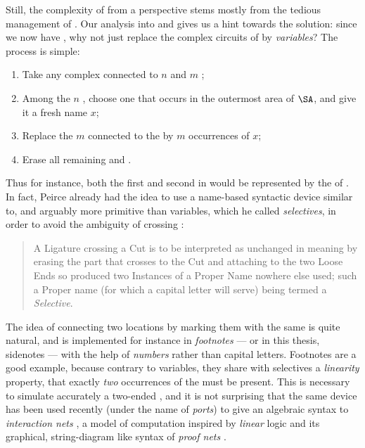 \begin{scope}
\begin{scope}
Still, the complexity of  from a  perspective stems mostly from the
tedious management of . Our analysis into  and  gives us
a hint towards the solution: since we now have , why not just replace
the complex circuits of  by \emph{variables}? The process is
simple:
\begin{enumerate}
  \item Take any complex  connected to $n$  and $m$ ;
  \item Among the $n$ , choose one that occurs in the outermost area of
  $\SA$, and give it a fresh name $x$;
  \item Replace the $m$  connected to the  by $m$ occurrences of $x$;
  \item Erase all remaining  and .
\end{enumerate}
Thus for instance, both the first and second  in
 would be represented by the  of
. In fact, Peirce already had the idea to use a
name-based syntactic device similar to, and arguably more primitive than
variables, which he called \emph{selectives}, in order to avoid the ambiguity of
 crossing  \cite[p.~531]{peirce_prolegomena_1906}:
\begin{quote}
A Ligature crossing a Cut is to be interpreted as unchanged in meaning by
erasing the part that crosses to the Cut and attaching to the two Loose Ends so
produced two Instances of a Proper Name nowhere else used; such a Proper name
(for which a capital letter will serve) being termed a \emph{Selective}.
\end{quote}
The idea of connecting two locations by marking them with the same  is
quite natural, and is implemented for instance in \emph{footnotes} --- or in
this thesis, sidenotes --- with the help of \emph{numbers} rather than capital
letters. Footnotes are a good example, because contrary to variables, they share
with selectives a \emph{linearity} property, that exactly \emph{two} occurrences
of the  must be present. This is necessary to simulate accurately a
two-ended , and it is not surprising that the same device has been used
recently (under the name of \emph{ports}) to give an algebraic syntax to
\emph{interaction nets} , a model of
computation inspired by \emph{linear} logic and its graphical, string-diagram
like syntax of \emph{proof nets} \cite{girard-linear-1987}.


\end{scope}
\end{scope}
